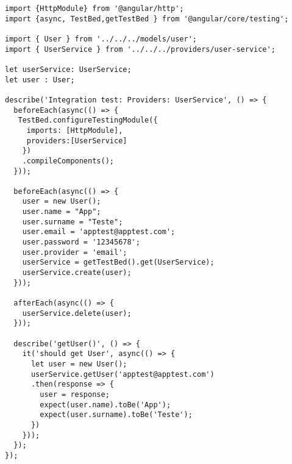 \medskip
\begin{lstlisting}
import {HttpModule} from '@angular/http';
import {async, TestBed,getTestBed } from '@angular/core/testing';

import { User } from '../../../models/user';
import { UserService } from '../../../providers/user-service';

let userService: UserService;
let user : User;

describe('Integration test: Providers: UserService', () => {
  beforeEach(async(() => {
   TestBed.configureTestingModule({
     imports: [HttpModule],
     providers:[UserService]
    })
    .compileComponents();
  }));

  beforeEach(async(() => {
    user = new User();
    user.name = "App";
    user.surname = "Teste";
    user.email = 'apptest@apptest.com';
    user.password = '12345678';
    user.provider = 'email';
    userService = getTestBed().get(UserService);
    userService.create(user);
  }));

  afterEach(async(() => {
    userService.delete(user);
  }));

  describe('getUser()', () => {
    it('should get User', async(() => {
      let user = new User();
      userService.getUser('apptest@apptest.com')
      .then(response => {
        user = response;
        expect(user.name).toBe('App');
        expect(user.surname).toBe('Teste');
      })
    }));
  });
});
\end{lstlisting}
